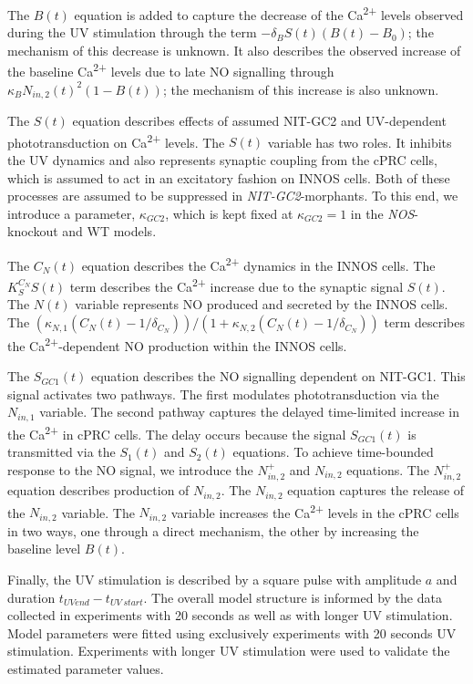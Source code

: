 \documentclass[
  11pt,
  letterpaper,
  DIV=11,
  numbers=noendperiod]{scrartcl}
\begin{document}
The \(B(t)\) equation is added to capture the decrease of the
Ca\textsuperscript{2+} levels observed during the UV stimulation through
the term \(- \delta_{B} S(t) (B(t)-B_0)\); the mechanism of this
decrease is unknown. It also describes the observed increase of the
baseline Ca\textsuperscript{2+} levels due to late NO signalling through
\(\kappa_{B} N_{in,2}(t)^2 (1-B(t))\); the mechanism of this increase is
also unknown.

The \(S(t)\) equation describes effects of assumed NIT-GC2 and
UV-dependent phototransduction on Ca\textsuperscript{2+} levels. The
\(S(t)\) variable has two roles. It inhibits the UV dynamics and also
represents synaptic coupling from the cPRC cells, which is assumed to
act in an excitatory fashion on INNOS cells. Both of these processes are
assumed to be suppressed in \emph{NIT-GC2}-morphants. To this end, we
introduce a parameter, \(\kappa_{GC2}\), which is kept fixed at
\(\kappa_{GC2}=1\) in the \emph{NOS}-knockout and WT models.

The \(C_N(t)\) equation describes the Ca\textsuperscript{2+} dynamics in
the INNOS cells. The \(K_{S}^{C_N} S(t)\) term describes the
Ca\textsuperscript{2+} increase due to the synaptic signal \(S(t)\). The
\(N(t)\) variable represents NO produced and secreted by the INNOS
cells. The
\((\kappa_{N,1} (C_N(t) - 1/\delta_{C_N}))/(1 + \kappa_{N,2}(C_N(t) - 1/\delta_{C_N}))\)
term describes the Ca\textsuperscript{2+}-dependent NO production within
the INNOS cells.

The \(S_{GC1}(t)\) equation describes the NO signalling dependent on
NIT-GC1. This signal activates two pathways. The first modulates
phototransduction via the \(N_{in,1}\) variable. The second pathway
captures the delayed time-limited increase in the Ca\textsuperscript{2+}
in cPRC cells. The delay occurs because the signal \(S_{GC1}(t)\) is
transmitted via the \(S_1(t)\) and \(S_2(t)\) equations. To achieve
time-bounded response to the NO signal, we introduce the
\(N_{in,2}^{+}\) and \(N_{in,2}\) equations. The \(N_{in,2}^{+}\)
equation describes production of \(N_{in,2}\). The \(N_{in,2}\) equation
captures the release of the \(N_{in,2}\) variable. The \(N_{in,2}\)
variable increases the Ca\textsuperscript{2+} levels in the cPRC cells
in two ways, one through a direct mechanism, the other by increasing the
baseline level \(B(t)\).

Finally, the UV stimulation is described by a square pulse with
amplitude \(a\) and duration \(t_{UV end} - t_{UV \: start}\). The
overall model structure is informed by the data collected in experiments
with 20 seconds as well as with longer UV stimulation. Model parameters
were fitted using exclusively experiments with 20 seconds UV
stimulation. Experiments with longer UV stimulation were used to
validate the estimated parameter values.
\end{document}
